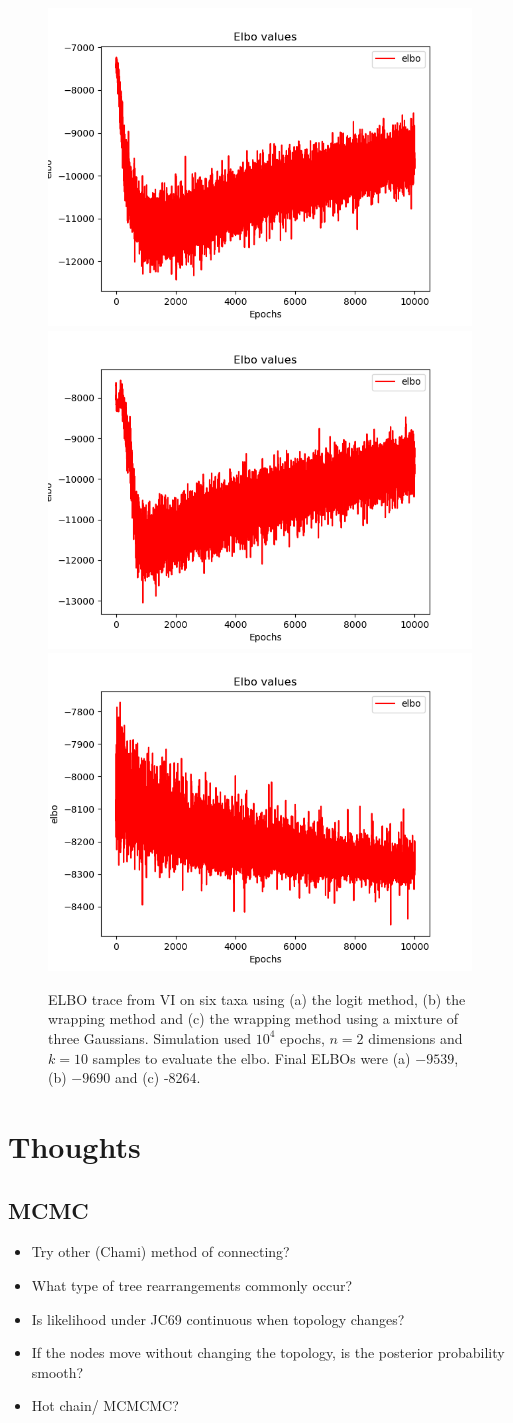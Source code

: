 \documentclass[11pt]{article}
\begin{document}
\begin{figure}[htbp]
\begin{center}
\includegraphics[width=.333\linewidth]{fig/elbo_trace_logit.png}%
\includegraphics[width=.333\linewidth]{fig/elbo_trace_wrap.png}%
\includegraphics[width=.333\linewidth]{fig/elbo_trace_wrap_B3.png}
\caption{ELBO trace from VI on six taxa using (a) the logit method, (b) the wrapping method and (c) the wrapping method using a mixture of three Gaussians. Simulation used $10^{4}$ epochs, $n=2$ dimensions and $k=10$ samples to evaluate the elbo. Final ELBOs were (a) $-9539$, (b) $-9690$ and (c) -8264.}
\label{fig:elbo}
\end{center}
\end{figure}

\section{Thoughts}
\subsection{MCMC}
\begin{itemize}
\item Try other (Chami) method of connecting?
\item What type of tree rearrangements commonly occur?
\item Is likelihood under JC69 continuous when topology changes?
\item If the nodes move without changing the topology, is the posterior probability smooth?
\item Hot chain/ MCMCMC?
\end{itemize}
\end{document}
